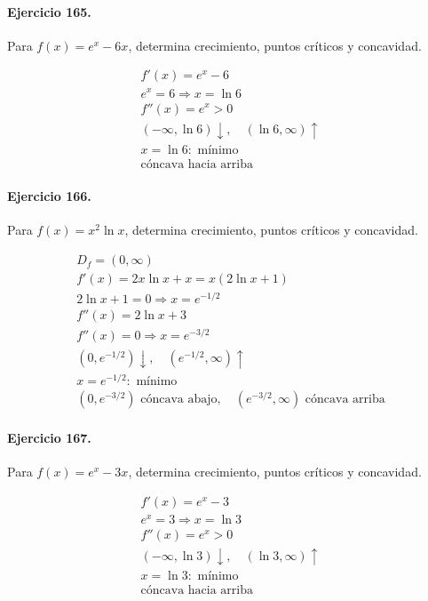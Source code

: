 \documentclass[11pt,a4paper]{article}
\begin{document}
\paragraph{Ejercicio 165.} Para $f(x)=e^x-6x$, determina crecimiento, puntos críticos y concavidad.

\[
\begin{aligned}
f'(x)=e^x-6\\
e^x=6\Rightarrow x=\ln 6\\
f''(x)=e^x>0\\
(-\infty,\ln 6)\downarrow,\quad(\ln 6,\infty)\uparrow\\
x=\ln 6:\text{ mínimo}\\
\text{{cóncava hacia arriba}}
\end{aligned}
\]


\paragraph{Ejercicio 166.} Para $f(x)=x^2\ln x$, determina crecimiento, puntos críticos y concavidad.

\[
\begin{aligned}
D_f=(0,\infty)\\
f'(x)=2x\ln x+x=x(2\ln x+1)\\
2\ln x+1=0\Rightarrow x=e^{-1/2}\\
f''(x)=2\ln x+3\\
f''(x)=0\Rightarrow x=e^{-3/2}\\
(0,e^{-1/2})\downarrow,\quad(e^{-1/2},\infty)\uparrow\\
x=e^{-1/2}:\text{{ mínimo}}\\
(0,e^{-3/2})\text{{ cóncava abajo}},\quad(e^{-3/2},\infty)\text{{ cóncava arriba}}
\end{aligned}
\]


\paragraph{Ejercicio 167.} Para $f(x)=e^x-3x$, determina crecimiento, puntos críticos y concavidad.

\[
\begin{aligned}
f'(x)=e^x-3\\
e^x=3\Rightarrow x=\ln 3\\
f''(x)=e^x>0\\
(-\infty,\ln 3)\downarrow,\quad(\ln 3,\infty)\uparrow\\
x=\ln 3:\text{ mínimo}\\
\text{{cóncava hacia arriba}}
\end{aligned}
\]
\end{document}
